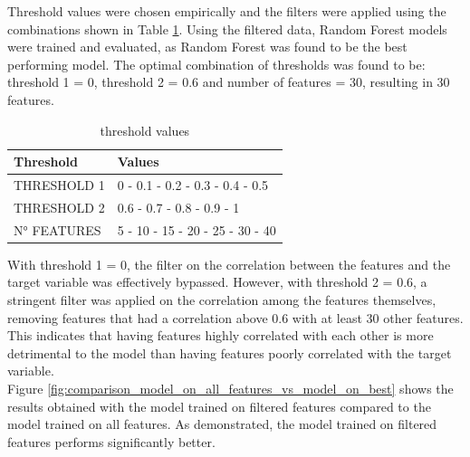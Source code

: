 Threshold values were chosen empirically and the filters were applied using the combinations shown in Table \ref{tab:threshold_values}.
Using the filtered data, Random Forest models were trained and evaluated, as Random Forest was found to be the best performing model.
The optimal combination of thresholds was found to be: threshold 1 = 0, threshold 2 = 0.6 and number of features = 30, resulting in 30 features.

\begin{table}[h]
    \centering
    \small
    \begin{tabular}{|ll|}
        \hline
        \textbf{Threshold} & \textbf{Values}                 \\
        \hline
        THRESHOLD 1        & 0 - 0.1 - 0.2 - 0.3 - 0.4 - 0.5 \\
        THRESHOLD 2        & 0.6 - 0.7 - 0.8 - 0.9 - 1       \\
        N° FEATURES        & 5 - 10 - 15 - 20 - 25 - 30 - 40 \\
        \hline
    \end{tabular}
    \caption{threshold values}
    \label{tab:threshold_values}
\end{table}
\noindent
With threshold 1 = 0, the filter on the correlation between the features and the target variable was effectively bypassed.
However, with threshold 2 = 0.6, a stringent filter was applied on the correlation among the features themselves,
removing features that had a correlation above 0.6 with at least 30 other features. This indicates that having features
highly correlated with each other is more detrimental to the model than having features poorly correlated with the target variable.\\
Figure \ref{fig:comparison_model_on_all_features_vs_model_on_best} shows the results obtained with the model trained on filtered features
compared to the model trained on all features. As demonstrated, the model trained on filtered features performs significantly better.

